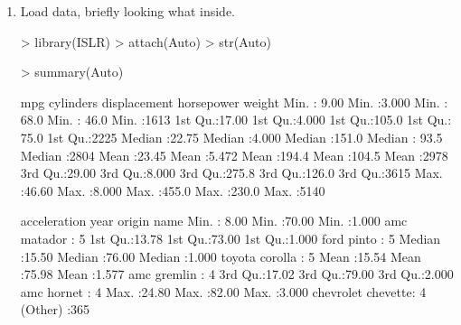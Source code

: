 \documentclass[a4paper]{article}
\begin{document}
\begin{enumerate}
\item Load data, briefly looking what inside.
\begin{Schunk}
\begin{Sinput}
> library(ISLR)
> attach(Auto)
> str(Auto)
\end{Sinput}
\begin{Sinput}
> summary(Auto)
\end{Sinput}
\begin{Soutput}
      mpg          cylinders      displacement     horsepower        weight    
 Min.   : 9.00   Min.   :3.000   Min.   : 68.0   Min.   : 46.0   Min.   :1613  
 1st Qu.:17.00   1st Qu.:4.000   1st Qu.:105.0   1st Qu.: 75.0   1st Qu.:2225  
 Median :22.75   Median :4.000   Median :151.0   Median : 93.5   Median :2804  
 Mean   :23.45   Mean   :5.472   Mean   :194.4   Mean   :104.5   Mean   :2978  
 3rd Qu.:29.00   3rd Qu.:8.000   3rd Qu.:275.8   3rd Qu.:126.0   3rd Qu.:3615  
 Max.   :46.60   Max.   :8.000   Max.   :455.0   Max.   :230.0   Max.   :5140  
                                                                               
  acceleration        year           origin                      name    
 Min.   : 8.00   Min.   :70.00   Min.   :1.000   amc matador       :  5  
 1st Qu.:13.78   1st Qu.:73.00   1st Qu.:1.000   ford pinto        :  5  
 Median :15.50   Median :76.00   Median :1.000   toyota corolla    :  5  
 Mean   :15.54   Mean   :75.98   Mean   :1.577   amc gremlin       :  4  
 3rd Qu.:17.02   3rd Qu.:79.00   3rd Qu.:2.000   amc hornet        :  4  
 Max.   :24.80   Max.   :82.00   Max.   :3.000   chevrolet chevette:  4  
                                                 (Other)           :365  
\end{Soutput}
\end{Schunk}


\end{enumerate}
\end{document}
